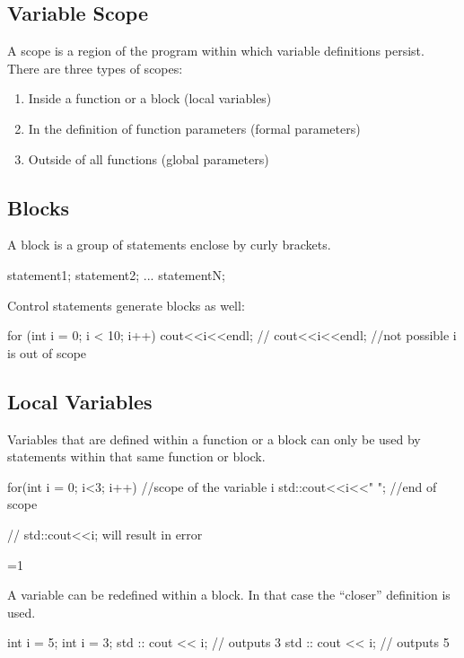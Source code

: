 \documentclass[10pt,a4paper]{scrartcl}
\gdef\conditionmacro{1}
\begin{document}
\begin{multicols*}{2}
\section{Variable Scope}

A scope is a region of the program within which variable definitions persist. There are three types of scopes:

\begin{enumerate}
\item Inside a function or a block (local variables)
\item In the definition of function parameters (formal parameters)
\item Outside of all functions (global parameters)
\end{enumerate}

\subsection{Blocks}

A block is a group of statements enclose by curly brackets.

\begin{TPCpp}
{statement1; statement2; ... statementN;}
\end{TPCpp}

Control statements generate blocks as well:

\begin{TPCpp}
for (int i = 0; i < 10; i++){
	cout<<i<<endl;
}
// cout<<i<<endl; //not possible i is out of scope
\end{TPCpp}

\subsection{Local Variables}

Variables that are defined within a function or a block can only be used by statements within that same function or block.

\begin{TPCpp}
for(int i = 0; i<3; i++){ //scope of the variable i
	std::cout<<i<<" ";
} //end of scope

// std::cout<<i; will result in error
\end{TPCpp}

\ifnum\conditionmacro=1

A variable can be redefined within a block. In that case the ``closer'' definition is used.

\begin{TPCpp}
int i = 5;
{
	int i = 3;
	std :: cout << i; // outputs 3
}
std :: cout << i; // outputs 5
\end{TPCpp}
\fi


\end{multicols*}
\end{document}

